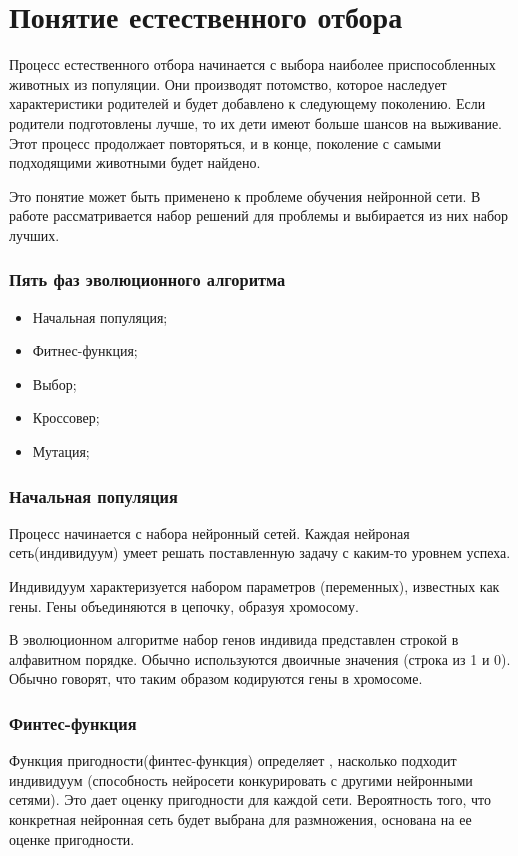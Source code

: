 \section{Понятие естественного отбора}

Процесс естественного отбора начинается с выбора наиболее приспособленных животных из популяции. Они производят потомство, которое наследует характеристики родителей и будет добавлено к следующему поколению. Если родители подготовлены лучше, то их дети имеют больше шансов на выживание. Этот процесс продолжает повторяться, и в конце, поколение с самыми подходящими животными будет найдено.

Это понятие может быть применено к проблеме обучения нейронной сети. В работе рассматривается набор решений для проблемы и выбирается из них набор лучших.

\subsubsection{Пять фаз эволюционного алгоритма}
\begin{itemize}
  \item Начальная популяция;
  \item Фитнес-функция;
  \item Выбор;
  \item Кроссовер;
  \item Мутация;
\end{itemize}

\subsubsection{Начальная популяция}
Процесс начинается с набора нейронный сетей. Каждая нейроная сеть(индивидуум) умеет решать поставленную задачу с каким-то уровнем успеха.

Индивидуум характеризуется набором параметров (переменных), известных как гены. Гены объединяются в цепочку, образуя хромосому.

В эволюционном алгоритме набор генов индивида представлен строкой в алфавитном порядке. Обычно используются двоичные значения (строка из 1 и 0). Обычно говорят, что таким образом кодируются гены в хромосоме.

\subsubsection{Финтес-функция}
Функция пригодности(финтес-функция) определяет , насколько подходит индивидуум (способность нейросети конкурировать с другими нейронными сетями). Это дает оценку пригодности для каждой сети. Вероятность того, что конкретная нейронная сеть будет выбрана для размножения, основана на ее оценке пригодности.

